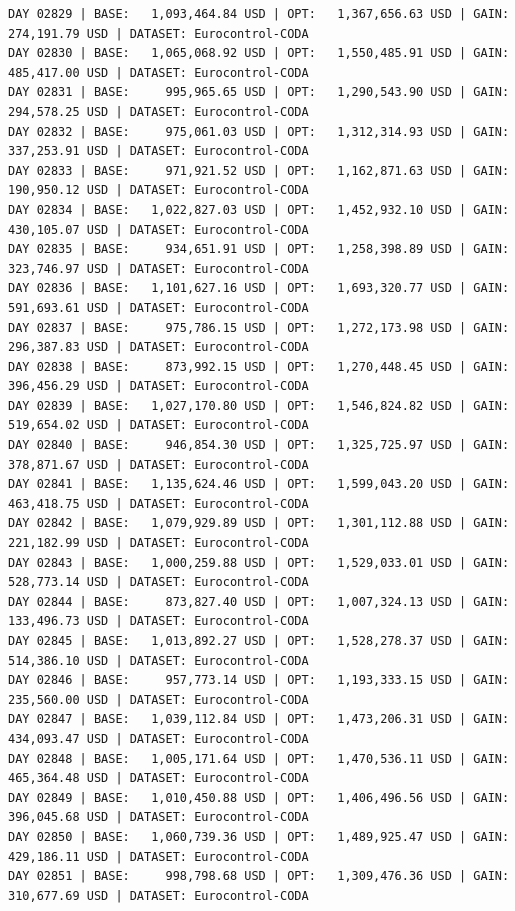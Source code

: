 \documentclass[11pt,a4paper]{article}
\begin{document}
\begin{verbatim}
DAY 02829 | BASE:   1,093,464.84 USD | OPT:   1,367,656.63 USD | GAIN: 274,191.79 USD | DATASET: Eurocontrol-CODA
DAY 02830 | BASE:   1,065,068.92 USD | OPT:   1,550,485.91 USD | GAIN: 485,417.00 USD | DATASET: Eurocontrol-CODA
DAY 02831 | BASE:     995,965.65 USD | OPT:   1,290,543.90 USD | GAIN: 294,578.25 USD | DATASET: Eurocontrol-CODA
DAY 02832 | BASE:     975,061.03 USD | OPT:   1,312,314.93 USD | GAIN: 337,253.91 USD | DATASET: Eurocontrol-CODA
DAY 02833 | BASE:     971,921.52 USD | OPT:   1,162,871.63 USD | GAIN: 190,950.12 USD | DATASET: Eurocontrol-CODA
DAY 02834 | BASE:   1,022,827.03 USD | OPT:   1,452,932.10 USD | GAIN: 430,105.07 USD | DATASET: Eurocontrol-CODA
DAY 02835 | BASE:     934,651.91 USD | OPT:   1,258,398.89 USD | GAIN: 323,746.97 USD | DATASET: Eurocontrol-CODA
DAY 02836 | BASE:   1,101,627.16 USD | OPT:   1,693,320.77 USD | GAIN: 591,693.61 USD | DATASET: Eurocontrol-CODA
DAY 02837 | BASE:     975,786.15 USD | OPT:   1,272,173.98 USD | GAIN: 296,387.83 USD | DATASET: Eurocontrol-CODA
DAY 02838 | BASE:     873,992.15 USD | OPT:   1,270,448.45 USD | GAIN: 396,456.29 USD | DATASET: Eurocontrol-CODA
DAY 02839 | BASE:   1,027,170.80 USD | OPT:   1,546,824.82 USD | GAIN: 519,654.02 USD | DATASET: Eurocontrol-CODA
DAY 02840 | BASE:     946,854.30 USD | OPT:   1,325,725.97 USD | GAIN: 378,871.67 USD | DATASET: Eurocontrol-CODA
DAY 02841 | BASE:   1,135,624.46 USD | OPT:   1,599,043.20 USD | GAIN: 463,418.75 USD | DATASET: Eurocontrol-CODA
DAY 02842 | BASE:   1,079,929.89 USD | OPT:   1,301,112.88 USD | GAIN: 221,182.99 USD | DATASET: Eurocontrol-CODA
DAY 02843 | BASE:   1,000,259.88 USD | OPT:   1,529,033.01 USD | GAIN: 528,773.14 USD | DATASET: Eurocontrol-CODA
DAY 02844 | BASE:     873,827.40 USD | OPT:   1,007,324.13 USD | GAIN: 133,496.73 USD | DATASET: Eurocontrol-CODA
DAY 02845 | BASE:   1,013,892.27 USD | OPT:   1,528,278.37 USD | GAIN: 514,386.10 USD | DATASET: Eurocontrol-CODA
DAY 02846 | BASE:     957,773.14 USD | OPT:   1,193,333.15 USD | GAIN: 235,560.00 USD | DATASET: Eurocontrol-CODA
DAY 02847 | BASE:   1,039,112.84 USD | OPT:   1,473,206.31 USD | GAIN: 434,093.47 USD | DATASET: Eurocontrol-CODA
DAY 02848 | BASE:   1,005,171.64 USD | OPT:   1,470,536.11 USD | GAIN: 465,364.48 USD | DATASET: Eurocontrol-CODA
DAY 02849 | BASE:   1,010,450.88 USD | OPT:   1,406,496.56 USD | GAIN: 396,045.68 USD | DATASET: Eurocontrol-CODA
DAY 02850 | BASE:   1,060,739.36 USD | OPT:   1,489,925.47 USD | GAIN: 429,186.11 USD | DATASET: Eurocontrol-CODA
DAY 02851 | BASE:     998,798.68 USD | OPT:   1,309,476.36 USD | GAIN: 310,677.69 USD | DATASET: Eurocontrol-CODA

\end{verbatim}
\end{document}
